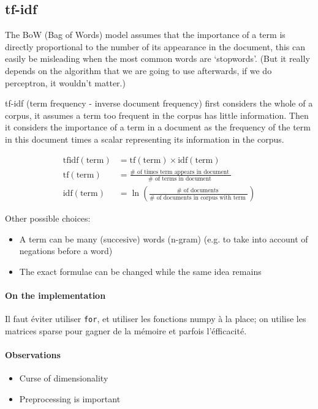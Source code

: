 \documentclass{article}
\begin{document}
\subsection{tf-idf}

The BoW (Bag of Words) model assumes that the importance of a term is directly proportional to
the number of its appearance in the document, this can easily be misleading
when the most common words are `stopwords'. (But it really depends on
the algorithm that we are going to use afterwards, if we do perceptron, it wouldn't matter.)

tf-idf (term frequency - inverse document frequency) first considers
the whole of a corpus, it assumes a term too frequent in the corpus has little
information. Then it considers the importance of a term in a document
as the frequency of the term in this document times a scalar
representing its information in the corpus.

$$
\begin{aligned}
\mathrm{tfidf}(\mathrm{term}) & = \mathrm{tf}(\mathrm{term}) \times \mathrm{idf}(\mathrm{term}) \\
\mathrm{tf}(\mathrm{term}) & = \frac{\# \text { of times term appears in document }}{\# \text { of terms in document }} \\
\mathrm{idf}(\mathrm{term}) & =\ln \left(\frac{\# \text { of documents }}{\# \text { of documents in corpus with term }}\right)
\end{aligned}
$$

Other possible choices:

\begin{itemize}
  \item A term can be many (succesive) words (n-gram) (e.g. to
  take into account of negations before a word)
  \item The exact formulae can be changed while the same idea remains
\end{itemize}

\paragraph{On the implementation} Il faut éviter utiliser \verb|for|, et
utiliser les fonctions numpy à la place; on utilise les matrices sparse pour
gagner de la mémoire et parfois l'éfficacité.

\paragraph{Observations}
\begin{itemize}
  \item Curse of dimensionality
  \item Preprocessing is important
\end{itemize}
\end{document}
